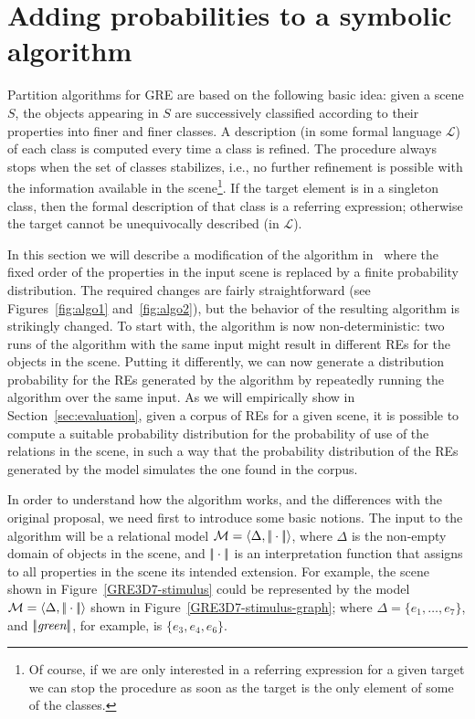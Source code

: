 \section{Adding probabilities to a symbolic algorithm} \label{sec:algorithm}

Partition algorithms for GRE are based on the following basic idea: given a 
scene $S$, the objects appearing in $S$ are successively classified according
to their properties into finer and finer classes. A description (in some formal language $\mathcal{L}$) of each 
class is computed every time a class is refined.   The procedure always stops when the 
set of classes stabilizes, i.e., no further refinement is possible with the information 
available in the scene\footnote{Of course, if we are only interested in a referring expression for 
a given target we can stop the procedure as soon as the target is the only element of some of the classes.}.  If the target element is in a singleton class, then 
the formal description of that class is a referring expression; otherwise the 
target cannot be unequivocally described (in $\mathcal{L}$).  

In this section we will describe a modification of the algorithm in~\cite{arec2:2008:Areces} where the fixed order of the properties in the 
input scene is replaced by a finite probability distribution.  The required changes
are fairly straightforward (see Figures~\ref{fig:algo1} and~\ref{fig:algo2}), but 
the behavior of the resulting algorithm is strikingly changed. To start with, the 
algorithm is now non-deterministic: two runs of the algorithm with the same 
input might result in different REs for the objects in the scene.  Putting 
it differently, we can now generate a distribution probability for the REs generated by the algorithm by repeatedly running 
the algorithm over the same input.  As we will empirically show in Section~\ref{sec:evaluation}, given a 
corpus of REs for a given scene, it is possible to compute a suitable probability 
distribution for the probability of use of the relations in the scene, in such a way that the probability 
distribution of the REs generated by the model simulates the one found in the corpus.

In order to understand how the algorithm works, and the differences with the original proposal, we need first to introduce some 
basic notions.  The input to the algorithm will be a relational model $\mathcal{M} = \langle \Delta, |\!|\cdot|\!| \rangle$,
where $\Delta$ is the non-empty domain of objects in the scene, and $|\!|\cdot|\!|$ is an 
interpretation function that assigns to all properties in the scene its intended extension.  For example, 
the scene shown in Figure~\ref{GRE3D7-stimulus} could be represented by the model $\mathcal{M}=\langle \Delta,|\!|\cdot|\!| \rangle$ shown in Figure~\ref{GRE3D7-stimulus-graph}; where $\Delta = \{e_1,\ldots,e_7\}$, and $|\!|\emph{green}|\!|$, for example, is $\{e_3,e_4,e_6\}$.

